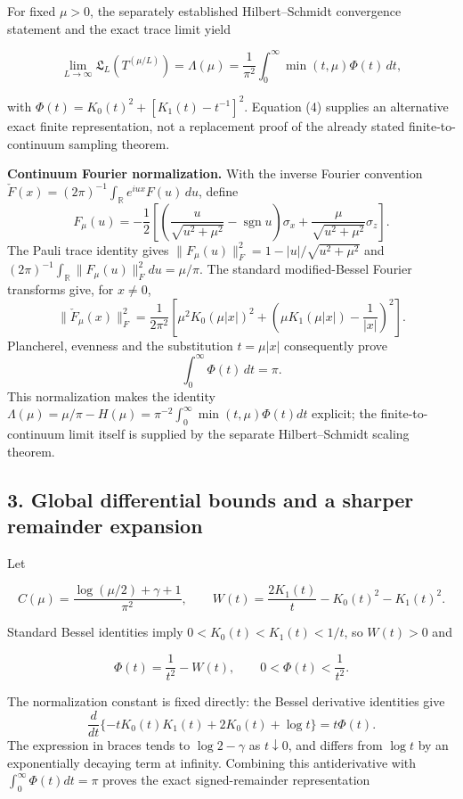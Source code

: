 \documentclass[
  10pt,
  a4paper,
]{article}
\begin{document}
For fixed \(\mu>0\), the separately established Hilbert--Schmidt convergence statement and the exact trace limit yield

\[
\lim_{L\to\infty}\mathfrak L_L(T^{(\mu/L)})=\Lambda(\mu)
=\frac1{\pi^2}\int_0^\infty\min(t,\mu)\Phi(t)\,dt,
\]

with \(\Phi(t)=K_0(t)^2+[K_1(t)-t^{-1}]^2\). Equation (4) supplies an alternative exact finite representation, not a replacement proof of the already stated finite-to-continuum sampling theorem.

\textbf{Continuum Fourier normalization.} With the inverse Fourier convention \(\check F(x)=(2\pi)^{-1}\int_{\mathbb R}e^{iux}F(u)\,du\), define \[
F_\mu(u)=-\frac12\left[
\left(\frac{u}{\sqrt{u^2+\mu^2}}-\operatorname{sgn}u\right)\sigma_x
+\frac{\mu}{\sqrt{u^2+\mu^2}}\sigma_z\right].
\] The Pauli trace identity gives \(\|F_\mu(u)\|_F^2=1-|u|/\sqrt{u^2+\mu^2}\) and \((2\pi)^{-1}\int_{\mathbb R}\|F_\mu(u)\|_F^2du=\mu/\pi\). The standard modified-Bessel Fourier transforms give, for \(x\ne0\), \[
\|\check F_\mu(x)\|_F^2
=\frac1{2\pi^2}\left[\mu^2K_0(\mu|x|)^2+
\left(\mu K_1(\mu|x|)-\frac1{|x|}\right)^2\right].
\] Plancherel, evenness and the substitution \(t=\mu|x|\) consequently prove \[
\boxed{\int_0^\infty\Phi(t)\,dt=\pi.}
\] This normalization makes the identity \(\Lambda(\mu)=\mu/\pi-H(\mu)=\pi^{-2}\int_0^\infty\min(t,\mu)\Phi(t)dt\) explicit; the finite-to-continuum limit itself is supplied by the separate Hilbert--Schmidt scaling theorem.

\subsection{3. Global differential bounds and a sharper remainder expansion}\label{global-differential-bounds-and-a-sharper-remainder-expansion}

Let

\[
C(\mu)=\frac{\log(\mu/2)+\gamma+1}{\pi^2},\qquad
W(t)=\frac{2K_1(t)}t-K_0(t)^2-K_1(t)^2.
\]

Standard Bessel identities imply \(0<K_0(t)<K_1(t)<1/t\), so \(W(t)>0\) and

\[
\Phi(t)=\frac1{t^2}-W(t),\qquad 0<\Phi(t)<\frac1{t^2}.
\tag{5}
\]

The normalization constant is fixed directly: the Bessel derivative identities give \[
\frac{d}{dt}\{-tK_0(t)K_1(t)+2K_0(t)+\log t\}=t\Phi(t).
\] The expression in braces tends to \(\log2-\gamma\) as \(t\downarrow0\), and differs from \(\log t\) by an exponentially decaying term at infinity. Combining this antiderivative with \(\int_0^\infty\Phi(t)dt=\pi\) proves the exact signed-remainder representation
\end{document}
